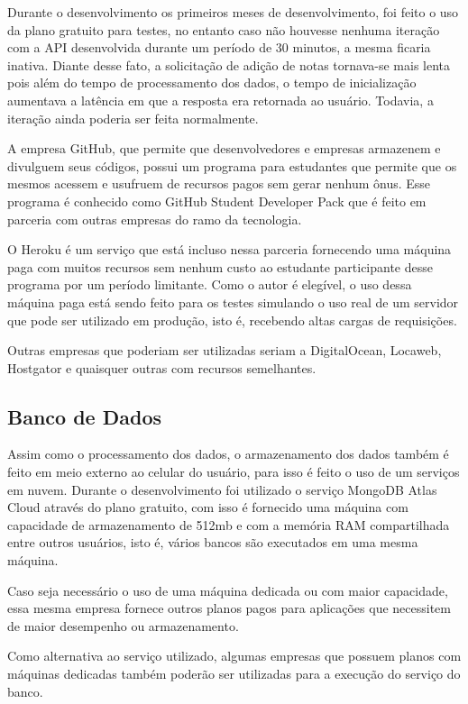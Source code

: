 Durante o desenvolvimento os primeiros meses de desenvolvimento, foi feito o uso da plano gratuito para testes, no entanto caso não houvesse nenhuma iteração com a API desenvolvida durante um período de 30 minutos, a mesma ficaria inativa. Diante desse fato, a solicitação de adição de notas tornava-se mais lenta pois além do tempo de processamento dos dados, o tempo de inicialização aumentava a latência em que a resposta era retornada ao usuário. Todavia, a iteração ainda poderia ser feita normalmente.

A empresa GitHub, que permite que desenvolvedores e empresas armazenem e divulguem seus códigos, possui um programa para estudantes que permite que os mesmos acessem e usufruem de recursos pagos sem gerar nenhum ônus. Esse programa é conhecido como GitHub Student Developer Pack que é feito em parceria com outras empresas do ramo da tecnologia.

O Heroku é um serviço que está incluso nessa parceria fornecendo uma máquina paga com muitos recursos sem nenhum custo ao estudante participante desse programa por um período limitante. Como o autor é elegível, o uso dessa máquina paga está sendo feito para os testes simulando o uso real de um servidor que pode ser utilizado em produção, isto é, recebendo altas cargas de requisições.

Outras empresas que poderiam ser utilizadas seriam a DigitalOcean, Locaweb, Hostgator e quaisquer outras com recursos semelhantes.

\subsection{Banco de Dados}

Assim como o processamento dos dados, o armazenamento dos dados também é feito em meio externo ao celular do usuário, para isso é feito o uso de um serviços em nuvem. Durante o desenvolvimento foi utilizado o serviço MongoDB Atlas Cloud através do plano gratuito, com isso é fornecido uma máquina com capacidade de armazenamento de 512mb e com a memória RAM compartilhada entre outros usuários, isto é, vários bancos são executados em uma mesma máquina.

Caso seja necessário o uso de uma máquina dedicada ou com maior capacidade, essa mesma empresa fornece outros planos pagos para aplicações que necessitem de maior desempenho ou armazenamento.

Como alternativa ao serviço utilizado, algumas empresas que possuem planos com máquinas dedicadas também poderão ser utilizadas para a execução do serviço do banco.

